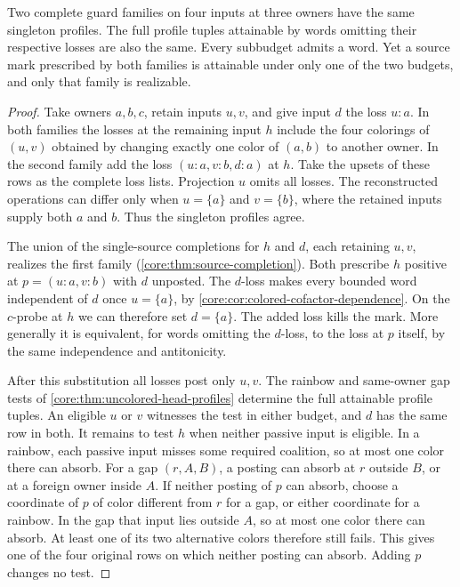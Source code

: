 \begin{proposition}
\label{core:prop:global-profiles-miss-mark}
Two complete guard families on four inputs at three owners have the same
singleton profiles. The full profile tuples attainable by words omitting
their respective losses are also the same. Every subbudget admits a word.
Yet a source mark prescribed by both families is attainable under only
one of the two budgets, and only that family is realizable.
\end{proposition}
\begin{proof}
Take owners $a,b,c$, retain inputs $u,v$, and give input $d$ the loss
$u{:}a$. In both families the losses at the remaining input $h$ include
the four colorings of $(u,v)$ obtained by changing exactly one color
of $(a,b)$ to another owner. In the second family add the loss
$(u{:}a,v{:}b,d{:}a)$ at $h$. Take the upsets of these rows as the
complete loss lists. Projection $u$ omits all losses. The reconstructed
operations can differ only when $u=\{a\}$ and $v=\{b\}$, where the
retained inputs supply both $a$ and $b$. Thus the singleton profiles agree.

The union of the single-source completions for $h$ and $d$, each retaining
$u,v$, realizes the first family (\cref{core:thm:source-completion}).
Both prescribe $h$ positive at $p=(u{:}a,v{:}b)$ with $d$ unposted.
The $d$-loss makes every bounded word independent of $d$ once
$u=\{a\}$, by \cref{core:cor:colored-cofactor-dependence}.
On the $c$-probe at $h$ we can therefore set $d=\{a\}$.
The added loss kills the mark. More generally it is equivalent, for
words omitting the $d$-loss, to the loss at $p$ itself, by the same
independence and antitonicity.

After this substitution all losses post only $u,v$. The rainbow and
same-owner gap tests of \cref{core:thm:uncolored-head-profiles} determine
the full attainable profile tuples. An eligible $u$ or $v$ witnesses
the test in either budget, and $d$ has the same row in both.
It remains to test $h$ when neither passive input is eligible.
In a rainbow, each passive input misses some required coalition,
so at most one color there can absorb. For a gap $(r,A,B)$, a
posting can absorb at $r$ outside $B$, or at a foreign owner inside
$A$. If neither posting of $p$ can absorb, choose a coordinate of
$p$ of color different from $r$ for a gap, or either coordinate
for a rainbow. In the gap that input lies outside $A$, so at most
one color there can absorb. At least one of its two alternative
colors therefore still fails. This gives one of the four original
rows on which neither posting can absorb. Adding $p$ changes no test.
\end{proof}

